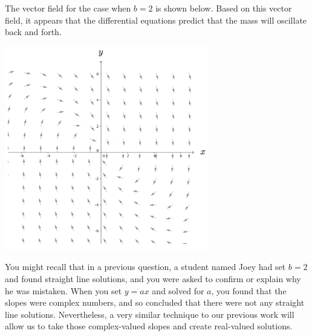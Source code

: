 The vector field for the case when $b = 2$ is shown below.  Based on this vector field, it appears that the differential equations predict that the mass will oscillate back and forth. 

\begin{center}
\includegraphics[width=3.5in]{11/11figure.png}
\end{center} 

You might recall that in a previous question, a student named Joey had set $b=2$ and found straight line solutions, and you were asked to confirm or explain why he was mistaken.  When you set $y=ax$ and solved for $a$, you found that the slopes were complex numbers, and so concluded that there were not any straight line solutions.  Nevertheless, a very similar technique to our previous work will allow us to take those complex-valued slopes and create real-valued solutions.  


